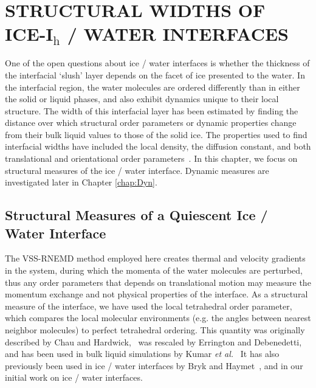 \chapter{STRUCTURAL WIDTHS OF ICE-I$_\mathrm{h}$ / WATER INTERFACES}
One of the open questions about ice / water interfaces is whether the
thickness of the interfacial `slush' layer depends on the facet of ice
presented to the water. In the interfacial region, the water molecules
are ordered differently than in either the solid or liquid phases, and
also exhibit dynamics unique to their local structure.  The width of
this interfacial layer has been estimated by finding the distance over
which structural order parameters or dynamic properties change from
their bulk liquid values to those of the solid ice. The properties
used to find interfacial widths have included the local density, the
diffusion constant, and both translational and orientational order
parameters~\cite{Karim1988,Karim1990,Hayward2001,Hayward2002,Bryk2002,Gay2002,Louden2013a}. In
this chapter, we focus on structural measures of the ice / water
interface. Dynamic measures are investigated later in Chapter \ref{chap:Dyn}.

\section{Structural Measures of a Quiescent Ice / Water Interface}\label{structure}

The VSS-RNEMD method employed here creates thermal and velocity
gradients in the system, during which the momenta of the water
molecules are perturbed, thus any order parameters that depends on
translational motion may measure the momentum exchange and not
physical properties of the interface.  As a structural measure of the
interface, we have used the local tetrahedral order parameter, which
compares the local molecular environments (e.g. the angles between
nearest neighbor molecules) to perfect tetrahedral ordering.  This
quantity was originally described by Chau and
Hardwick,~\cite{Chau1998} was rescaled by Errington and
Debenedetti,~\cite{Errington2001} and has been used in bulk liquid
simulations by Kumar \textit{et al.}~\cite{Kumar2009} It has also
previously been used in ice / water interfaces by Bryk and
Haymet~\cite{Bryk2004}, and in our initial work on ice / water
interfaces\cite{Louden2013a}.

